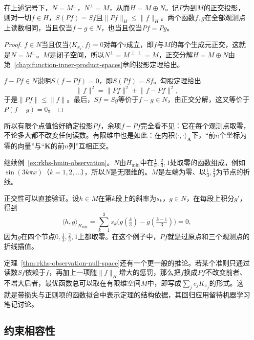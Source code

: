 \begin{theorem}[观测零空间的正交补]
\label{thm:rkhs-observation-null-space}
在上述记号下，$N=M^\perp$，$N^\perp=M$，从而$H=M\oplus N$。记$P$为到$M$的正交投影，则对一切$f\in H$，$S(Pf)=Sf$且$\lVert Pf\rVert_H\leq\lVert f\rVert_H$。两个函数$f,g$在全部观测点上读数相同，当且仅当$f-g\in N$，也当且仅当$Pf=Pg$。
\end{theorem}

\begin{proof}
$f\in N$当且仅当$\langle K_{x_i},f\rangle=0$对每个$i$成立，即$f$与$M$的每个生成元正交，这就是$N=M^\perp$。$M$是闭子空间，所以$N^\perp=M^{\perp\perp}=M$，正交分解$H=M\oplus N$由第~\ref{chap:function-inner-product-spaces}章的投影定理给出。

$f-Pf\in N$说明$S(f-Pf)=0$，即$S(Pf)=Sf$。勾股定理给出
\[
\lVert f\rVert^2=\lVert Pf\rVert^2+\lVert f-Pf\rVert^2 ,
\]
于是$\lVert Pf\rVert\leq\lVert f\rVert$。最后，$Sf=Sg$等价于$f-g\in N$，由正交分解，这又等价于$P(f-g)=0$。
\end{proof}

所以有限个点值恰好确定投影$Pf$，余项$f-Pf$完全看不见：它在每个观测点取零，不论多大都不改变任何读数。有限维中也是如此：在内积$\langle\cdot,\cdot\rangle_{\bm A}$下，“前$n$个坐标为零的向量”与“$\bm K$的前$n$列”互相正交。

\begin{example}[折线与观测零空间的正交性]
\label{ex:rkhs-hmin-null-space}
继续例~\ref{ex:rkhs-hmin-observation}。$N$由$H_{\min}$中在$\tfrac13,\tfrac23,1$处取零的函数组成，例如$\sin(3k\pi x)$（$k=1,2,\ldots$），所以$N$是无限维的。$M$是左端为零、以$\tfrac13,\tfrac23$为节点的折线。

正交性可以直接验证。设$h\in M$在第$k$段上的斜率为$s_k$，$g\in N$，在每段上积分$g'$，得到
\[
\langle h,g\rangle_{H_{\min}}=\sum_{k=1}^3s_k\bigl(g(\tfrac k3)-g(\tfrac{k-1}3)\bigr)=0 ,
\]
因为$g$在四个节点$0,\tfrac13,\tfrac23,1$上都取零。在这个例子中，$Pf$就是过原点和三个观测点的折线插值。
\end{example}

定理~\ref{thm:rkhs-observation-null-space}还有一个更一般的推论。若某个准则只通过读数$Sf$依赖于$f$，再加上一项随$\lVert f\rVert_H$增大的惩罚，那么把$f$换成$Pf$不改变前者、不增大后者，最优函数总可以取在有限维空间$M$中，即写成$\sum_jc_jK_{x_j}$的形式。这就是带损失与正则项的函数拟合中表示定理的结构依据，其回归应用留待机器学习笔记讨论。

\subsection{约束相容性}
\label{sec:rkhs-consistency}

